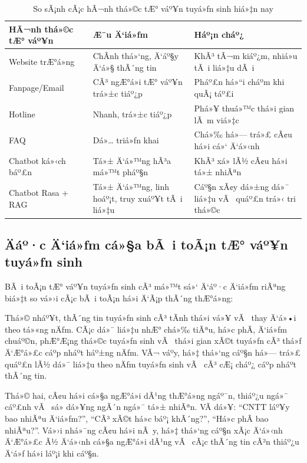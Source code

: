 ﻿\documentclass[12pt,a4paper]{report}
\begin{document}
\begin{table}[H]
    \centering
    \caption{So sÃ¡nh cÃ¡c hÃ¬nh thá»©c tÆ° váº¥n tuyá»ƒn sinh hiá»‡n nay}
    \label{tab:comparison_admission_consulting_methods}
    \begin{tabular}{|p{3.4cm}|p{5.2cm}|p{5.2cm}|}
        \hline
        \textbf{HÃ¬nh thá»©c tÆ° váº¥n} & \textbf{Æ¯u Ä‘iá»ƒm} & \textbf{Háº¡n cháº¿} \\ \hline
        Website trÆ°á»ng & ChÃ­nh thá»‘ng, Ä‘áº§y Ä‘á»§ thÃ´ng tin & KhÃ³ tÃ¬m kiáº¿m, nhiá»u tÃ i liá»‡u dÃ i \\ \hline
        Fanpage/Email & CÃ³ ngÆ°á»i tÆ° váº¥n trá»±c tiáº¿p & Pháº£n há»“i cháº­m khi quÃ¡ táº£i \\ \hline
        Hotline & Nhanh, trá»±c tiáº¿p & Phá»¥ thuá»™c thá»i gian lÃ m viá»‡c \\ \hline
        FAQ & Dá»… triá»ƒn khai & Chá»‰ há»— trá»£ cÃ¢u há»i cá»‘ Ä‘á»‹nh \\ \hline
        Chatbot ká»‹ch báº£n & Tá»± Ä‘á»™ng hÃ³a má»™t pháº§n & KhÃ³ xá»­ lÃ½ cÃ¢u há»i tá»± nhiÃªn \\ \hline
        Chatbot Rasa + RAG & Tá»± Ä‘á»™ng, linh hoáº¡t, truy xuáº¥t tÃ i liá»‡u & Cáº§n xÃ¢y dá»±ng dá»¯ liá»‡u vÃ  quáº£n trá»‹ tri thá»©c \\ \hline
    \end{tabular}
\end{table}

\subsection{Äáº·c Ä‘iá»ƒm cá»§a bÃ i toÃ¡n tÆ° váº¥n tuyá»ƒn sinh}

BÃ i toÃ¡n tÆ° váº¥n tuyá»ƒn sinh cÃ³ má»™t sá»‘ Ä‘áº·c Ä‘iá»ƒm riÃªng biá»‡t so vá»›i cÃ¡c bÃ i toÃ¡n há»i Ä‘Ã¡p thÃ´ng thÆ°á»ng:

Thá»© nháº¥t, thÃ´ng tin tuyá»ƒn sinh cÃ³ tÃ­nh thá»i vá»¥ vÃ  thay Ä‘á»•i theo tá»«ng nÄƒm. CÃ¡c dá»¯ liá»‡u nhÆ° chá»‰ tiÃªu, há»c phÃ­, Ä‘iá»ƒm chuáº©n, phÆ°Æ¡ng thá»©c tuyá»ƒn sinh vÃ  thá»i gian xÃ©t tuyá»ƒn cÃ³ thá»ƒ Ä‘Æ°á»£c cáº­p nháº­t háº±ng nÄƒm. VÃ¬ váº­y, há»‡ thá»‘ng cáº§n há»— trá»£ quáº£n lÃ½ dá»¯ liá»‡u theo nÄƒm tuyá»ƒn sinh vÃ  cÃ³ cÆ¡ cháº¿ cáº­p nháº­t thÃ´ng tin.

Thá»© hai, cÃ¢u há»i cá»§a ngÆ°á»i dÃ¹ng thÆ°á»ng ngáº¯n, thiáº¿u ngá»¯ cáº£nh vÃ  sá»­ dá»¥ng ngÃ´n ngá»¯ tá»± nhiÃªn. VÃ­ dá»¥: ``CNTT láº¥y bao nhiÃªu Ä‘iá»ƒm?'', ``CÃ³ xÃ©t há»c báº¡ khÃ´ng?'', ``Há»c phÃ­ bao nhiÃªu?''. Vá»›i nhá»¯ng cÃ¢u há»i nÃ y, há»‡ thá»‘ng cáº§n xÃ¡c Ä‘á»‹nh Ä‘Æ°á»£c Ã½ Ä‘á»‹nh cá»§a ngÆ°á»i dÃ¹ng vÃ  cÃ¡c thÃ´ng tin cÃ²n thiáº¿u Ä‘á»ƒ há»i láº¡i khi cáº§n.
\end{document}
